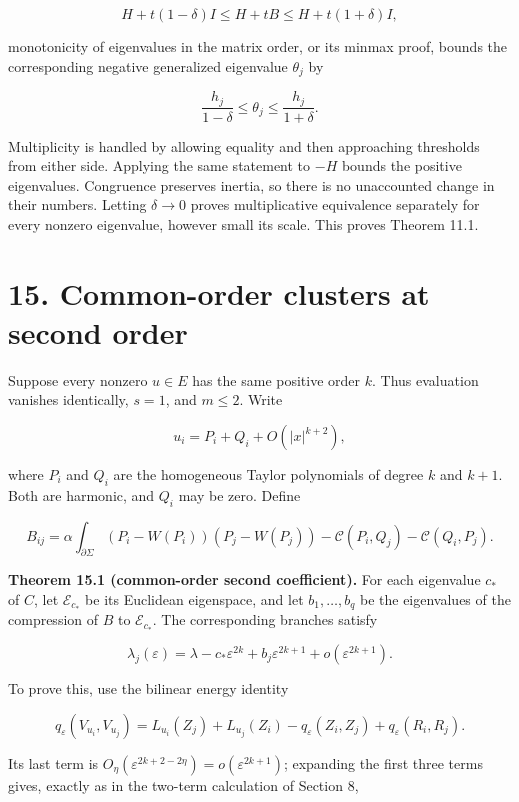 \documentclass[11pt]{article}
\begin{document}
\[
 H+t(1-\delta)I\le H+tB\le H+t(1+\delta)I,
\]

monotonicity of eigenvalues in the matrix order, or its minmax proof,
bounds the corresponding negative generalized eigenvalue \(\theta_j\) by

\[
 \frac{h_j}{1-\delta}\le\theta_j\le\frac{h_j}{1+\delta}.
 \tag{M19}
\]

Multiplicity is handled by allowing equality and then approaching
thresholds from either side. Applying the same statement to \(-H\)
bounds the positive eigenvalues. Congruence preserves inertia, so there
is no unaccounted change in their numbers. Letting \(\delta\to0\) proves
multiplicative equivalence separately for every nonzero eigenvalue,
however small its scale. This proves Theorem 11.1.

\section{15. Common-order clusters at second
order}\label{common-order-clusters-at-second-order}

Suppose every nonzero \(u\in E\) has the same positive order \(k\). Thus
evaluation vanishes identically, \(s=1\), and \(m\le2\). Write

\[
 u_i=P_i+Q_i+O(|x|^{k+2}),
\]

where \(P_i\) and \(Q_i\) are the homogeneous Taylor polynomials of
degree \(k\) and \(k+1\). Both are harmonic, and \(Q_i\) may be zero.
Define

\[
 B_{ij}=\alpha\int_{\partial\Sigma}
        (P_i-W(P_i))(P_j-W(P_j))
       -\mathcal C(P_i,Q_j)-\mathcal C(Q_i,P_j).
 \tag{M20}
\]

\textbf{Theorem 15.1 (common-order second coefficient).} For each
eigenvalue \(c_*\) of \(C\), let \(\mathcal E_{c_*}\) be its Euclidean
eigenspace, and let \(b_1,\ldots,b_q\) be the eigenvalues of the
compression of \(B\) to \(\mathcal E_{c_*}\). The corresponding branches
satisfy

\[
 \lambda_j(\varepsilon)
 =\lambda-c_*\varepsilon^{2k}
           +b_j\varepsilon^{2k+1}+o(\varepsilon^{2k+1}).
 \tag{M21}
\]

To prove this, use the bilinear energy identity

\[
 q_\varepsilon(V_{u_i},V_{u_j})
 =L_{u_i}(Z_j)+L_{u_j}(Z_i)
       -q_\varepsilon(Z_i,Z_j)+q_\varepsilon(R_i,R_j).
 \tag{M22}
\]

Its last term is
\(O_\eta(\varepsilon^{2k+2-2\eta})=o(\varepsilon^{2k+1})\); expanding
the first three terms gives, exactly as in the two-term calculation of
Section 8,
\end{document}
